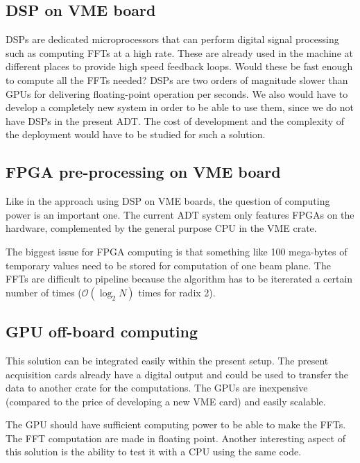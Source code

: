 \subsection{DSP on VME board}

\Glspl{DSP} are dedicated microprocessors that can perform digital signal processing such as computing \glspl{FFT} at a high rate. These are already used in the machine at different places to provide high speed feedback loops. Would these be fast enough to compute all the \glspl{FFT} needed? \glspl{DSP} are two orders of magnitude slower than \glspl{GPU} for delivering floating-point operation per seconds. We also would have to develop a completely new system in order to be able to use them, since we do not have \glspl{DSP} in the present \gls{ADT}. The cost of development and the complexity of the deployment would have to be studied for such a solution.

\subsection{FPGA pre-processing on VME board}

Like in the approach using \gls{DSP} on VME boards, the question of computing power is an important one. The current \gls{ADT} system only features \glspl{FPGA} on the hardware, complemented by the general purpose \gls{CPU} in the \gls{VME} crate.

The biggest issue for \gls{FPGA} computing is that something like 100 mega-bytes of temporary values need to be stored for computation of one beam plane. The \glspl{FFT} are difficult to pipeline because the algorithm has to be itererated a certain number of times ($\mathcal{O}(\log_{2} N)$ times for radix 2).

\subsection{GPU off-board computing}

This solution can be integrated easily within the present setup. The present acquisition cards already have a digital output and could be used to transfer the data to another crate for the computations. The \glspl{GPU} are inexpensive (compared to the price of developing a new \gls{VME} card) and easily scalable. 

The \gls{GPU} should have sufficient computing power to be able to make the \glspl{FFT}. The \gls{FFT} computation are made in floating point. Another interesting aspect of this solution is the ability to test it with a \gls{CPU} using the same code.

